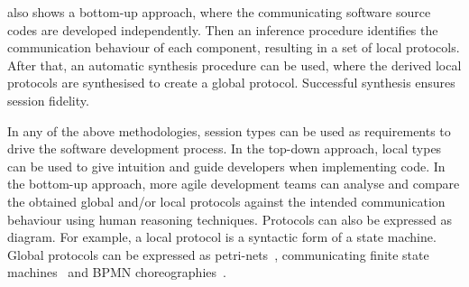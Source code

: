  also shows a bottom-up approach,
where the communicating software source codes are developed independently.
Then an inference  procedure identifies the communication behaviour
of each component, resulting in a set of local protocols.
After that, an automatic synthesis procedure can be used,
where the derived local protocols are synthesised
to create a global protocol. Successful synthesis
ensures session fidelity.


In any of the above methodologies, session types can be used as
requirements  to drive the software development process.
In the top-down approach, local types can be used to give intuition
and guide developers when implementing code.
In the bottom-up approach, more agile development teams
can analyse and compare the obtained global and/or local protocols
against the intended communication behaviour using human
reasoning techniques. Protocols can also be expressed
as diagram. For example, a local protocol is a syntactic form
of a state machine. Global protocols can be expressed as
petri-nets~\cite{DBLP:conf/tgc/FossatiHY14}, communicating
finite state machines~\cite{Denielou:2012:MST:2259248.2259258}
and BPMN choreographies~\cite{LTY2015}.







